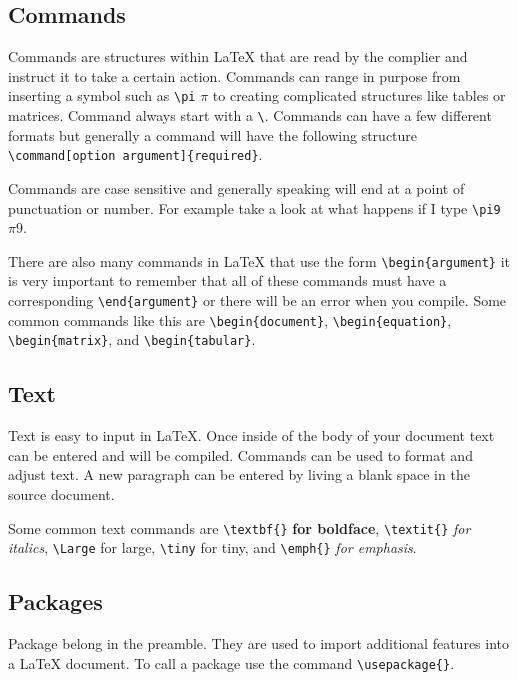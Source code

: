 \documentclass{article} 	%
\numberwithin{equation}{section}
\begin{document}
		\subsection{Commands}
		Commands are structures within \LaTeX{} that are read by the complier and instruct it to take a certain action.  Commands can range in purpose from inserting a symbol such as \verb|\pi| $\pi$ to creating complicated structures like tables or matrices.  Command always start with a \verb|\|.  Commands can have a few different formats but generally a command will have the following structure \verb|\command[option argument]{required}|.
		
		Commands are case sensitive and generally speaking will end at a point of punctuation or number.  For example take a look at what happens if I type \verb|\pi9| $\pi9$.
		
		There are also many commands in \LaTeX{} that use the form \verb|\begin{argument}| it is very important to remember that all of these commands must have a corresponding \verb|\end{argument}| or there will be an error when you compile.  Some common commands like this are \verb|\begin{document}|, \verb|\begin{equation}|, \verb|\begin{matrix}|, and \verb|\begin{tabular}|.
		
		\subsection{Text}
		Text is easy to input in \LaTeX{}.  Once inside of the body of your document text can be entered and will be compiled.  Commands can be used to format and adjust text.  A new paragraph can be entered by living a blank space in the source document.
		
		Some common text commands are \verb|\textbf{}| \textbf{for boldface}, \verb|\textit{}| \textit{for italics}, \verb|\Large| \Large for large\normalsize, \verb|\tiny| \tiny for tiny\normalsize, and \verb|\emph{}| \emph{for emphasis}.
		
		\subsection{Packages}
		Package belong in the preamble.  They are used to import additional features into a \LaTeX{} document.  To call a package use the command \verb|\usepackage{}|.
				
\end{document}
